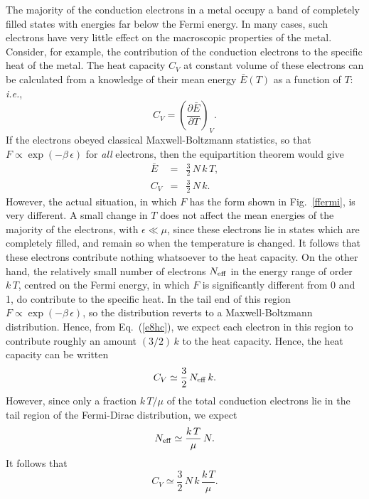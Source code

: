 The majority of the conduction electrons in a metal occupy a
band of completely filled states with energies far below the Fermi
energy. In many cases, such electrons have very little effect
on the macroscopic properties of the metal. Consider, for example, the
contribution of the conduction electrons to the specific heat of the metal.
The heat capacity $C_V$ at constant volume of these electrons can
be calculated from a knowledge of their mean energy $\bar{E}(T)$ as a
function of $T$: {\em i.e.},
\begin{equation}
C_V = \left(\frac{\partial \bar{E}}{\partial T}\right)_V.
\end{equation} 
If the electrons obeyed classical Maxwell-Boltzmann statistics, so that
$F\propto \exp(-\beta\,\epsilon)$ for {\em all}\/ electrons, then the
equipartition theorem would give
\begin{eqnarray}
\bar{E} &=& \frac{3}{2}\,N\,k\,T,\\[0.5ex]
C_V &=& \frac{3}{2}\,N\,k.\label{e8hc}
\end{eqnarray}
However, the actual situation, in which $F$ has the form shown in Fig.~\ref{ffermi},
is very different. A small change in $T$ does not affect the
mean  energies of
the majority of the electrons, with $\epsilon\ll \mu$, since these electrons
lie in states which are completely filled, and remain so when the temperature
is changed. It follows that these electrons contribute nothing whatsoever to
the heat capacity. On the other hand, the relatively small number of
electrons $N_{\rm eff}$ in the energy range of order $k\,T$, centred on the
Fermi energy, in which $F$ is significantly different from 0 and 1,
do contribute to the specific heat. In the tail end of this region
$F\propto \exp(-\beta\,\epsilon)$, so the
distribution reverts to a Maxwell-Boltzmann distribution.
Hence, from Eq.~(\ref{e8hc}),
we expect each electron in this region to contribute roughly an amount
$(3/2)\,k$ to the heat capacity. Hence, the heat capacity
can be written
\begin{equation}
C_V\simeq \frac{3}{2}\,N_{\rm eff}\,k.
\end{equation}
However, since only a fraction $k\,T/\mu$ of the total conduction
electrons lie in the tail region of the Fermi-Dirac distribution, we
expect
\begin{equation}
N_{\rm eff} \simeq \frac{k\,T}{\mu}\,N.
\end{equation}
It follows that
\begin{equation}
C_V \simeq \frac{3}{2}\,N\,k\,\frac{k\,T}{\mu}.\label{e8res}
\end{equation}

